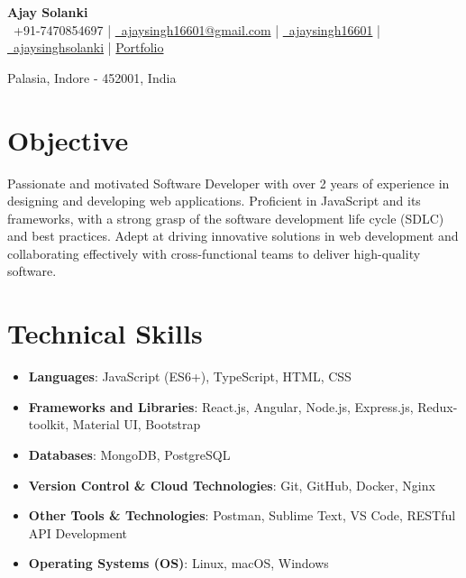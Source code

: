 \documentclass[a4paper,11pt]{article}
\newcommand{\resumeItem}[2]{\item \textbf{#1}: #2}
\begin{document}
\begin{center}
    {\Huge \textbf{Ajay Solanki}} \\[5pt]
    \small{
        \faPhone\ +91-7470854697 | 
        \href{mailto:ajaysingh16601@gmail.com}{\faEnvelope\ ajaysingh16601@gmail.com} | 
        \href{https://github.com/ajaysingh16601}{\faGithub\ ajaysingh16601} | \href{https://www.linkedin.com/in/ajaysinghsolanki/}{\faLinkedin\ ajaysinghsolanki} |
        {} \href{https://portfolio-threejs-ashy.vercel.app/}{Portfolio} 
    }
\end{center}
\vspace{-5.5mm}
\begin{center}
    \small{Palasia, Indore - 452001, India}
\end{center}

\section{Objective}
\small{
       Passionate and motivated Software Developer with over 2 years of experience in designing and developing web applications. Proficient in JavaScript and its frameworks, with a strong grasp of the software development life cycle (SDLC) and best practices. Adept at driving innovative solutions in web development and collaborating effectively with cross-functional teams to deliver high-quality software.

}

\section{Technical Skills}
\begin{itemize}[leftmargin=10pt]
    \resumeItem{Languages}{JavaScript (ES6+), TypeScript, HTML, CSS}
    \resumeItem{Frameworks and Libraries}{React.js, Angular, Node.js, Express.js, Redux-toolkit, Material UI, Bootstrap}
    \resumeItem{Databases}{MongoDB, PostgreSQL}
    \resumeItem{Version Control \& Cloud Technologies}
        {Git, GitHub, Docker, Nginx}
    \resumeItem{Other Tools \& Technologies}
        {Postman, Sublime Text, VS Code, RESTful API Development}
    \resumeItem{Operating Systems (OS)}
        {Linux, macOS, Windows}
\end{itemize}

\end{document}
